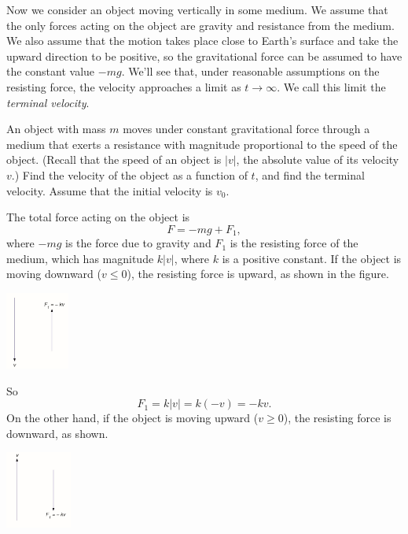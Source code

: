 \documentclass{ximera}
\begin{document}
Now we consider an object moving vertically in some medium. We assume
that the only forces acting on the object are gravity and resistance
from the medium. We also assume that the motion takes place close to
Earth's surface and take the upward direction to be positive, so
 the gravitational force can be assumed to have the constant value
 $-mg$. We'll see that, under reasonable assumptions on the
resisting force, the velocity approaches a limit as $t\to\infty$.
We call this limit the \textit{terminal velocity}.

\begin{example}\label{example:4.3.1}
An object with mass $m$ moves under constant gravitational force
through a medium that exerts a resistance with magnitude proportional
to the speed of the object. (Recall that the speed of an object is
$|v|$, the absolute value of its velocity $v$.) Find the velocity of
the object as a function of $t$, and find the terminal velocity.
Assume  that the initial velocity is $v_0$.
 

\begin{explanation}
The total force acting on the object is
\begin{equation} \label{eq:4.3.4}
F=-mg+F_1,
\end{equation}
where $-mg$ is  the force due to  gravity and $F_1$ is the
resisting force of the medium, which has magnitude $k|v|$, where $k$ is a
positive constant. If the
object is moving downward ($v\leq 0$),  the resisting force is
upward, as shown in the figure. 

\begin{image}
  \includegraphics[height=1in]{fig040301a.jpg} 
\end{image}

So
$$
F_1=k|v|=k(-v)=-kv.
$$
On the other hand, if the object is moving upward ($v\geq 0$),
the resisting force is downward, as shown. 

\begin{image}
  \includegraphics[height=1in]{fig040301b.jpg} 
\end{image}


\end{explanation}
\end{example}
\end{document}
